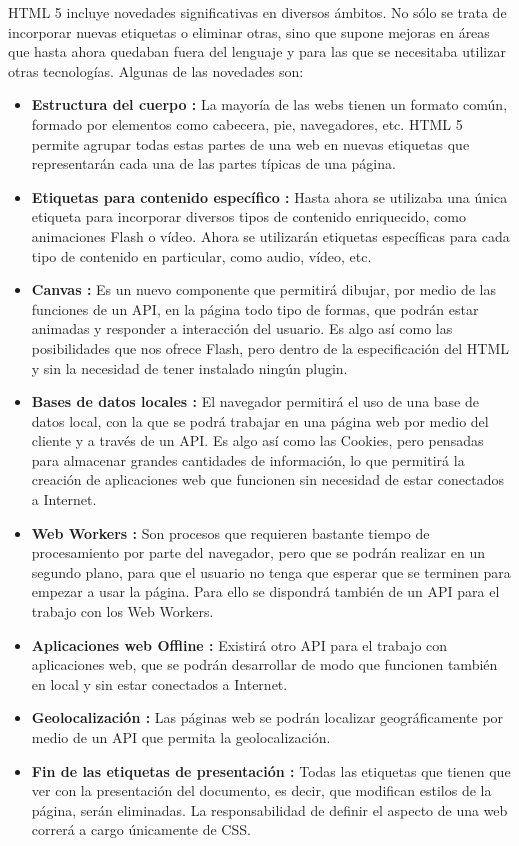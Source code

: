 \documentclass[letterpaper, 11pt, oneside]{article}
\theoremstyle{definition}
\theoremstyle{remark}
\begin{document}
\begin{itemize}
HTML 5 incluye novedades significativas en diversos ámbitos. No sólo se trata de incorporar nuevas etiquetas o eliminar otras, sino que supone mejoras en áreas que hasta ahora quedaban fuera del lenguaje y para las que se necesitaba utilizar otras tecnologías. Algunas de las novedades son:
\begin{itemize}
  \item \textbf{Estructura del cuerpo :} La mayoría de las webs tienen un formato común, formado por elementos como cabecera, pie, navegadores, etc. HTML 5 permite agrupar todas estas partes de una web en nuevas etiquetas que representarán cada una de las partes típicas de una página.
  \item \textbf{Etiquetas para contenido específico :} Hasta ahora se utilizaba una única etiqueta para incorporar diversos tipos de contenido enriquecido, como animaciones Flash o vídeo. Ahora se utilizarán etiquetas específicas para cada tipo de contenido en particular, como audio, vídeo, etc.
  \item \textbf{Canvas :} Es un nuevo componente que permitirá dibujar, por medio de las funciones de un API, en la página todo tipo de formas, que podrán estar animadas y responder a interacción del usuario. Es algo así como las posibilidades que nos ofrece Flash, pero dentro de la especificación del HTML y sin la necesidad de tener instalado ningún plugin.
\item \textbf{Bases de datos locales :} El navegador permitirá el uso de una base de datos local, con la que se podrá trabajar en una página web por medio del cliente y a través de un API. Es algo así como las Cookies, pero pensadas para almacenar grandes cantidades de información, lo que permitirá la creación de aplicaciones web que funcionen sin necesidad de estar conectados a Internet.
\item \textbf{Web Workers :} Son procesos que requieren bastante tiempo de procesamiento por parte del navegador, pero que se podrán realizar en un segundo plano, para que el usuario no tenga que esperar que se terminen para empezar a usar la página. Para ello se dispondrá también de un API para el trabajo con los Web Workers.
\item \textbf{Aplicaciones web Offline :} Existirá otro API para el trabajo con aplicaciones web, que se podrán desarrollar de modo que funcionen también en local y sin estar conectados a Internet.
\item \textbf{Geolocalización :} Las páginas web se podrán localizar geográficamente por medio de un API que permita la geolocalización.
\item \textbf{Fin de las etiquetas de presentación :} Todas las etiquetas que tienen que ver con la presentación del documento, es decir, que modifican estilos de la página, serán eliminadas. La responsabilidad de definir el aspecto de una web correrá a cargo únicamente de CSS.
\end{itemize}


\end{itemize}
\end{document}
